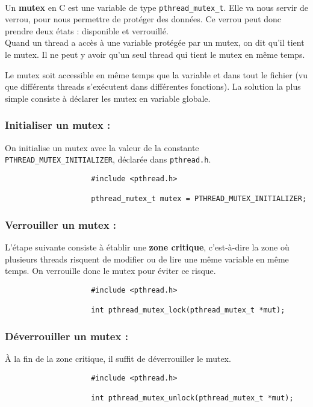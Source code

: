 			\paragraph{} Un \textbf{mutex} en C est une variable de type \lstinline!pthread_mutex_t!. Elle va nous servir de verrou, pour nous permettre de protéger des données. Ce verrou peut donc prendre deux états : disponible et verrouillé.\\
			Quand un thread a accès à une variable protégée par un mutex, on dit qu'il tient le mutex. Il ne peut y avoir qu'un seul thread qui tient le mutex en même temps.
			
			Le mutex soit accessible en même temps que la variable et dans tout le fichier (vu que différents threads s'exécutent dans différentes fonctions). La solution la plus simple consiste à déclarer les mutex en variable globale.

			\subsubsection*{Initialiser un mutex :}
				On initialise un mutex avec la valeur de la constante \lstinline!PTHREAD_MUTEX_INITIALIZER!, déclarée dans \lstinline!pthread.h!.
				\begin{lstlisting}
					#include <pthread.h>

					pthread_mutex_t mutex = PTHREAD_MUTEX_INITIALIZER;
				\end{lstlisting}

			\subsubsection*{Verrouiller un mutex :}
				L'étape suivante consiste à établir une \textbf{zone critique}, c'est-à-dire la zone où plusieurs threads risquent de modifier ou de lire une même variable en même temps. On verrouille donc le mutex pour éviter ce risque.
				\begin{lstlisting}
					#include <pthread.h>

					int pthread_mutex_lock(pthread_mutex_t *mut);
				\end{lstlisting}

			\subsubsection*{Déverrouiller un mutex :}
				À la fin de la zone critique, il suffit de déverrouiller le mutex.
				\begin{lstlisting}
					#include <pthread.h>

					int pthread_mutex_unlock(pthread_mutex_t *mut);
				\end{lstlisting}

